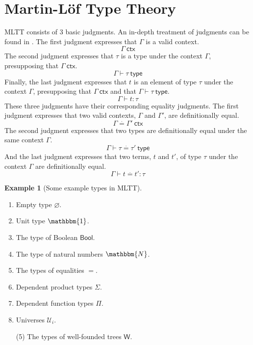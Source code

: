 \documentclass{amsart}
\theoremstyle{definition}
\newtheorem{eg}{Example}[section]
\newcommand{\N}{\mathbbm{N}}
\newcommand{\ctx}{\ensuremath{\mathsf{~ctx}}}
\newcommand{\type}{\ensuremath{\mathsf{~type}}}
\newcommand{\defeq}{\ensuremath{\overset{\boldsymbol{\cdot}}{=}}}
\newcommand{\Unit}{\ensuremath{\mathbbm{1}}}
\newcommand{\Bool}{\ensuremath{\mathsf{Bool}}}
\newcommand{\W}{\ensuremath{\mathsf{W}}}
\newcommand{\U}{\ensuremath{\mathcal{U}}}
\begin{document}
\section{Martin-L\"{o}f Type Theory}
\label{sec:martin-lof-type-theory}
MLTT consists of 3 basic judgments.
An in-depth treatment of judgments can be found in \cite{ml:justif-log}.
The first judgment expresses that $\Gamma$ is a valid context.
\[
\Gamma \ctx
\]
The second judgment expresses that $\tau$ is a type under the context $\Gamma$, presupposing that $\Gamma \ctx$.
\[
\Gamma \vdash \tau \type
\]
Finally, the last judgment expresses that $t$ is an element of type $\tau$ under the context $\Gamma$, presupposing that $\Gamma \ctx$ and that $\Gamma \vdash \tau \type$.
\[
\Gamma \vdash t : \tau
\]
These three judgments have their corresponding equality judgments.
The first judgment expresses that two valid contexts, $\Gamma$ and $\Gamma'$, are definitionally equal.
\[
\Gamma \defeq \Gamma' \ctx
\]
The second judgment expresses that two types are definitionally equal under the same context $\Gamma$.
\[
\Gamma \vdash \tau \defeq \tau' \type
\]
And the last judgment expresses that two terms, $t$ and $t'$, of type $\tau$ under the context $\Gamma$ are definitionally equal.
\[
\Gamma \vdash t \defeq t' : \tau
\]
\begin{eg}[Some example types in MLTT]
\hfill
\begin{multicols}{2}
\begin{enumerate}
\item Empty type $\varnothing$.
\item Unit type $\Unit$.
\item The type of Boolean $\Bool$.
\item The type of natural numbers $\N$.
\item The types of equalities $=$.
\item Dependent product types $\Sigma$.
\item Dependent function types $\Pi$.
\item Universes $\U_{i}$.
\end{enumerate}
\end{multicols}
\vspace{-\baselineskip}
\begin{enumerate}
    \item[(5)] The types of well-founded trees $\W$. 
\end{enumerate}
\end{eg}
\end{document}
